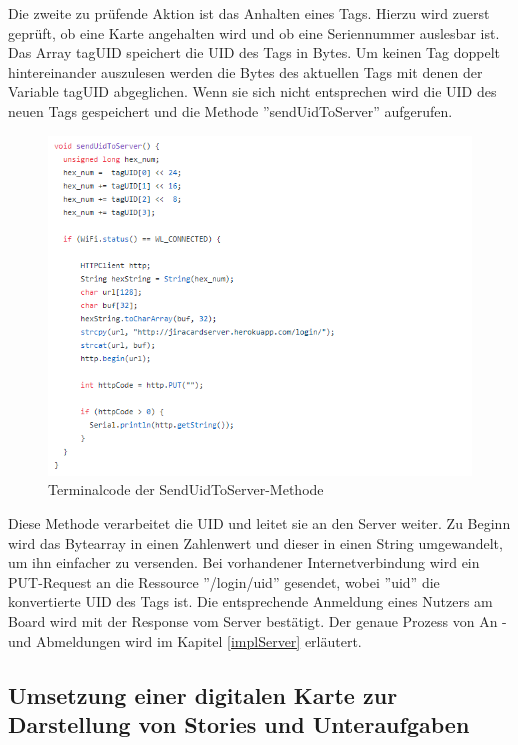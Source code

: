 \documentclass[12pt,titlepage]{scrartcl}
\begin{document}
		Die zweite zu prüfende Aktion ist das Anhalten eines Tags. Hierzu wird zuerst geprüft, ob eine Karte angehalten wird und ob eine Seriennummer auslesbar ist. Das Array tagUID speichert die UID des Tags in Bytes. Um keinen Tag doppelt hintereinander auszulesen werden die Bytes des aktuellen Tags mit denen der Variable tagUID abgeglichen. Wenn sie sich nicht entsprechen wird die UID des neuen Tags gespeichert und die Methode ''sendUidToServer'' aufgerufen.  \\
		\begin{figure}[H] 
  			\centering
    		\includegraphics[height=0.5\textheight]{terminalSendUid}
  			\caption{Terminalcode der SendUidToServer-Methode}
  			\label{fig:terminalSendUid}
		\end{figure}
		\noindent Diese Methode verarbeitet die UID und leitet sie an den Server weiter. Zu Beginn wird das Bytearray in einen Zahlenwert und dieser in einen String umgewandelt, um ihn einfacher zu versenden. Bei vorhandener Internetverbindung wird ein PUT-Request an die Ressource ''/login/uid'' gesendet, wobei ''uid'' die konvertierte UID des Tags ist. Die entsprechende Anmeldung eines Nutzers am Board wird mit der Response vom Server bestätigt. Der genaue Prozess von An -und Abmeldungen wird im Kapitel \ref{implServer} erläutert.
		\subsection{Umsetzung einer digitalen Karte zur Darstellung von Stories und Unteraufgaben}
\end{document}
